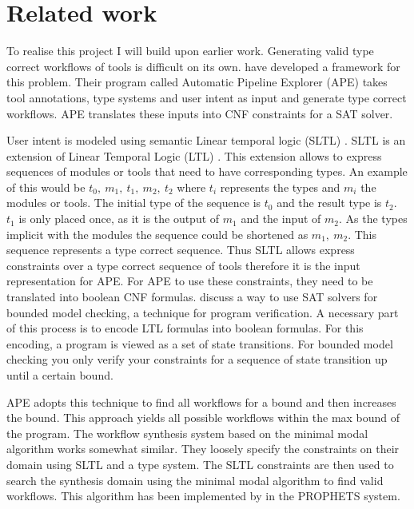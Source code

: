 \documentclass{article}
\begin{document}
\section{Related work }
To realise this project I will build upon earlier work. Generating valid type correct workflows of tools is difficult on its own. \cite{kasalica2020semantic} have developed a framework for this problem. Their program called Automatic Pipeline Explorer (APE) takes tool annotations, type systems and user intent as input and generate type correct workflows. APE translates these inputs into CNF constraints for a SAT solver. 

User intent is modeled using semantic Linear temporal logic (SLTL) \cite{Steffen93moduleconfiguration}. SLTL is an extension of Linear Temporal Logic (LTL) \cite{emerson1990temporal}. This extension allows to express sequences of modules or tools that need to have corresponding types. An example of this would be $t_0,\ m_1,\ t_1,\ m_2,\ t_2$ where $t_i$ represents the types and $m_i$ the modules or tools. The initial type of the sequence is  $t_0$ and the result type is $t_2$. $t_1$ is only placed once, as it is the output of $m_1$ and the input of $m_2$. As the types implicit with the modules the sequence could be shortened as $m_1,\ m_2$. This sequence represents a type correct sequence. Thus SLTL allows express constraints over a type correct sequence of tools therefore it is the input representation for APE. 
For APE to use these constraints, they need to be translated into boolean CNF formulas. \cite{Bounded_model_checking} discuss a way to use SAT solvers for bounded model checking, a technique for program verification. A necessary part of this process is to encode LTL formulas into boolean formulas. For this encoding, a program is viewed as a set of state transitions. For bounded model checking you only verify your constraints for a sequence of state transition up until a certain bound. 

APE adopts this technique to find all workflows for a bound and then increases the bound. This approach yields all possible workflows within the max bound of the program. The workflow synthesis system\cite{lamprecht2010synthesis} based on the minimal modal algorithm\cite{Steffen93moduleconfiguration} works somewhat similar.
They loosely specify the constraints on their domain using SLTL and a type system. The SLTL constraints are then used to search the synthesis domain using the minimal modal algorithm to find valid workflows.  
This algorithm has been implemented by \cite{Prophets} in the PROPHETS system.
\end{document}
